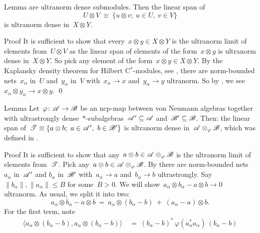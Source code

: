 \begin{parsec}
\begin{point}{Lemma}
    are ultranorm dense submodules.
Then the linear span of
\begin{equation*}
    U \otimes V \ \equiv\  \{ u \otimes v;\  u \in U,\ v \in V\}
\end{equation*}
is ultranorm dense in~$X \otimes Y$.
\begin{point}{Proof}%
It is sufficient to show that every~$x \otimes y \in X \otimes Y$
    is the ultranorm limit of elements from~$U \otimes V$
    as the linear span of elements of the form~$x \otimes y$
    is ultranorm dense in~$X \otimes Y$.
So pick any element of the form~$x \otimes y \in X \otimes Y$.
By the Kaplansky density theorem for Hilbert C$^*$-modules,
 see ,
    there are norm-bounded nets~$x_\alpha$ in~$U$
    and~$y_\alpha$ in~$V$
    with~$x_\alpha \to x$ and~$y_\alpha \to y$ ultranorm.
So by ,
    we see~$x_\alpha \otimes y_\alpha \to x \otimes y$. \qed
\end{point}
\end{point}
\begin{point}{Lemma}%
Let~$\varphi \colon \mathscr{A} \to \mathscr{B}$ be an ncp-map between von Neumann algebras
    together with ultrastrongly
    dense~$*$-subalgebras~$\mathscr{A}' \subseteq \mathscr{A}$
        and~$\mathscr{B}' \subseteq \mathscr{B}$.
Then: the linear span
    of~$ \mathscr{T}  \equiv \{ a \otimes b;\ a \in \mathscr{A}', \ b\in \mathscr{B}'\}$
is ultranorm dense in~$\mathscr{A} \otimes_\varphi \mathscr{B}$,
which was defined in  .
\begin{point}{Proof}%
It is sufficient to show that any~$a\otimes b \in \mathscr{A} \otimes_\varphi \mathscr{B}$
    is the ultranorm limit of elements from~$\mathscr{T}$.
    Pick any~$a\otimes b\in \mathscr{A} \otimes_\varphi \mathscr{B}$.
By 
    there are norm-bounded nets~$a_\alpha$ in~$\mathscr{A}'$ and
    $b_\alpha$ in~$\mathscr{B}'$
    with~$a_\alpha \to a$ and~$b_\alpha \to b$ ultrastrongly.
Say~$\|b_\alpha \|, \|a_\alpha\| \leq B$ for some~$B > 0$.
We will show~$a_\alpha \otimes b_\alpha - a\otimes b \to 0$ ultranorm.
As usual, we split it into two:
\begin{equation*}
a_\alpha \otimes b_\alpha - a \otimes b
\ = \ a_\alpha \otimes(b_\alpha -b )\  +\  (a_\alpha - a) \otimes b.
\end{equation*}
For the first term, note
\begin{align*}
    \langle a_\alpha \otimes (b_\alpha  - b),
    a_\alpha \otimes (b_\alpha  - b) \rangle
    & \ = \ 
    (b_\alpha - b)^* \,\varphi (a_\alpha^* a_\alpha) \,(b_\alpha - b) \\

\end{align*}
\end{point}
\end{point}
\end{parsec}

